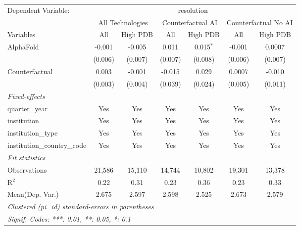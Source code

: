 \begingroup
\centering
\begin{tabular}{lcccccc}
   \tabularnewline \midrule \midrule
   Dependent Variable: & \multicolumn{6}{c}{resolution}\\
 & \multicolumn{2}{c}{All Technologies} & \multicolumn{2}{c}{Counterfactual AI} & \multicolumn{2}{c}{Counterfactual No AI} \\
\cmidrule(lr){1-1}\cmidrule(lr){2-3} \cmidrule(lr){4-5} \cmidrule(lr){6-7}
Variables & \multicolumn{1}{c}{All} & \multicolumn{1}{c}{High PDB} & \multicolumn{1}{c}{All} & \multicolumn{1}{c}{High PDB} & \multicolumn{1}{c}{All} & \multicolumn{1}{c}{High PDB} \\
\cmidrule(lr){1-1}\cmidrule(lr){2-2} \cmidrule(lr){3-3} \cmidrule(lr){4-4} \cmidrule(lr){5-5} \cmidrule(lr){6-6} \cmidrule(lr){7-7}
   AlphaFold                    & -0.001  & -0.005  & 0.011   & 0.015$^{*}$ & -0.001  & 0.0007\\   
                                & (0.006) & (0.007) & (0.007) & (0.008)     & (0.006) & (0.007)\\   
   Counterfactual               & 0.003   & -0.001  & -0.015  & 0.029       & 0.0007  & -0.010\\   
                                & (0.003) & (0.004) & (0.039) & (0.024)     & (0.005) & (0.011)\\   
   \midrule
   \emph{Fixed-effects}\\
   quarter\_year                & Yes     & Yes     & Yes     & Yes         & Yes     & Yes\\  
   institution                  & Yes     & Yes     & Yes     & Yes         & Yes     & Yes\\  
   institution\_type            & Yes     & Yes     & Yes     & Yes         & Yes     & Yes\\  
   institution\_country\_code   & Yes     & Yes     & Yes     & Yes         & Yes     & Yes\\  
   \midrule
   \emph{Fit statistics}\\
   Observations                 & 21,586  & 15,110  & 14,744  & 10,802      & 19,301  & 13,378\\  
   R$^2$                        & 0.22    & 0.31    & 0.23    & 0.36        & 0.23    & 0.33\\  
Mean(Dep. Var.) & 2.675 & 2.597 & 2.598 & 2.525 & 2.673 & 2.579 \\
   \midrule \midrule
   \multicolumn{7}{l}{\emph{Clustered (pi\_id) standard-errors in parentheses}}\\
   \multicolumn{7}{l}{\emph{Signif. Codes: ***: 0.01, **: 0.05, *: 0.1}}\\
\end{tabular}
\par\endgroup
